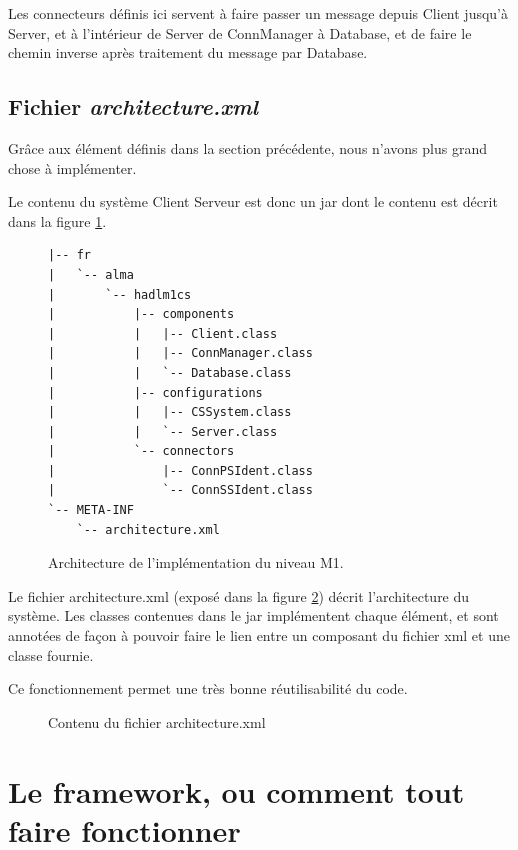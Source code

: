 \documentclass[french,a4paper,titlepage]{article}
\begin{document}
    	Les connecteurs définis ici servent à faire passer un message depuis
    	Client jusqu'à Server, et à l'intérieur de Server de ConnManager à
    	Database, et de faire le chemin inverse après traitement du message par
    	Database.
    
    \subsection{Fichier \emph{architecture.xml}}
	
		Grâce aux élément définis dans la section précédente, nous n'avons plus
		grand chose à implémenter.
		
		Le contenu du système Client Serveur est donc un jar dont le contenu est
		décrit dans la figure \ref{fig:m1jar}.
		\begin{figure}[htb]
		\begin{verbatim}
|-- fr
|   `-- alma
|       `-- hadlm1cs
|           |-- components
|           |   |-- Client.class
|           |   |-- ConnManager.class
|           |   `-- Database.class
|           |-- configurations
|           |   |-- CSSystem.class
|           |   `-- Server.class
|           `-- connectors
|               |-- ConnPSIdent.class
|               `-- ConnSSIdent.class
`-- META-INF
    `-- architecture.xml
		\end{verbatim}
		\caption{Architecture de l'implémentation du niveau M1.}
		\label{fig:m1jar}
		\end{figure}
		
		
		Le fichier architecture.xml (exposé dans la figure
		\ref{fig:architecture.xml}) décrit l'architecture du système. Les classes
		contenues dans le jar implémentent chaque élément, et sont annotées de façon
		à pouvoir faire le lien entre un composant du fichier xml et une classe
		fournie.
		
		Ce fonctionnement permet une très bonne réutilisabilité du code.
		
		
		\begin{figure}[htb]
			\centering
			
			\caption{Contenu du fichier architecture.xml}
			\label{fig:architecture.xml}

		\end{figure}
	
	\section{Le framework, ou comment tout faire fonctionner}
	
\end{document}
